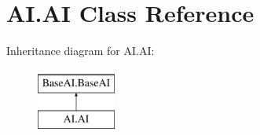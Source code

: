 \hypertarget{classAI_1_1AI}{\section{\-A\-I.\-A\-I \-Class \-Reference}
\label{classAI_1_1AI}
}
\-Inheritance diagram for \-A\-I.\-A\-I\-:\begin{figure}[H]
\begin{center}
\leavevmode
\includegraphics[height=2.000000cm]{classAI_1_1AI}
\end{center}
\end{figure}
